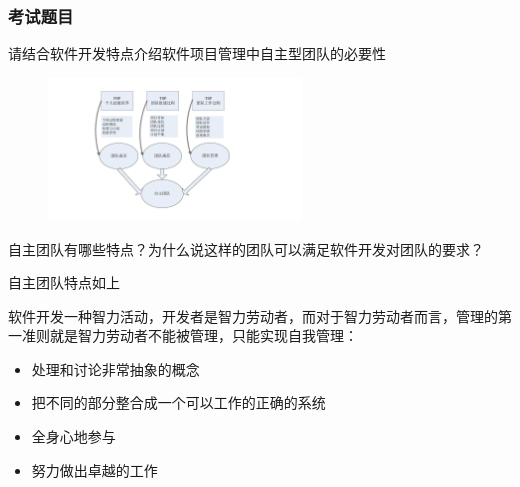 \subsubsection{考试题目}
\begin{problem}
请结合软件开发特点介绍软件项目管理中自主型团队的必要性
\begin{figure}[H]
    \vspace{-0.5em}
	\centering
	\includegraphics[width=0.6\textwidth]{images/PSP.pdf}
    \vspace{-1em}
\end{figure}
\vspace{-1em}
\end{problem}

\begin{problem}
自主团队有哪些特点？为什么说这样的团队可以满足软件开发对团队的要求？

自主团队特点如上

软件开发一种智力活动，开发者是智力劳动者，而对于智力劳动者而言，管理的第一准则就是智力劳动者不能被管理，只能实现自我管理：
\vspace{-0.8em}
\begin{multicols}{2}
    \begin{itemize}
        \item 处理和讨论非常抽象的概念
        \item 把不同的部分整合成一个可以工作的正确的系统
        \item 全身心地参与
        \item 努力做出卓越的工作
    \end{itemize}
\end{multicols}
\vspace{-1em}
\end{problem}

